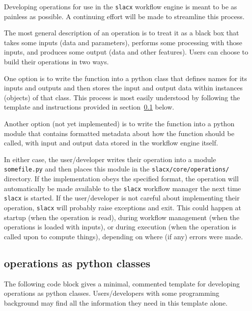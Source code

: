 Developing operations for use in the \verb|slacx| workflow engine 
is meant to be as painless as possible.
A continuing effort will be made to streamline this process.

The most general description of an operation 
is to treat it as a black box that takes some inputs (data and parameters),
performs some processing with those inputs,
and produces some output (data and other features).
Users can choose to build their operations in two ways.

One option is to write the function into a python class
that defines names for its inputs and outputs
and then stores the input and output data 
within instances (objects) of that class.
This process is most easily understood 
by following the template and instructions 
provided in section~\ref{sec:op_dev_by_class} below.

Another option (not yet implemented)
is to write the function into a python module 
that contains formatted metadata 
about how the function should be called,
with input and output data 
stored in the workflow engine itself.

In either case, the user/developer writes their operation 
into a module \verb|somefile.py|
and then places this module in the \verb|slacx/core/operations/| directory.
If the implementation obeys the specified format, 
the operation will automatically be made available 
to the \verb|slacx| workflow manager
the next time \verb|slacx| is started.
If the user/developer is not careful 
about implementing their operation,
\verb|slacx| will probably raise exceptions and exit. 
This could happen at startup (when the operation is read),
during workflow management (when the operations is loaded with inputs),
or during execution (when the operation is called upon to compute things),
depending on where (if any) errors were made.


\subsection{operations as python classes}
\label{sec:op_dev_by_class}

The following code block gives a minimal, 
commented template for developing
operations as python classes.
Users/developers with some programming background
may find all the information they need in this template alone.

